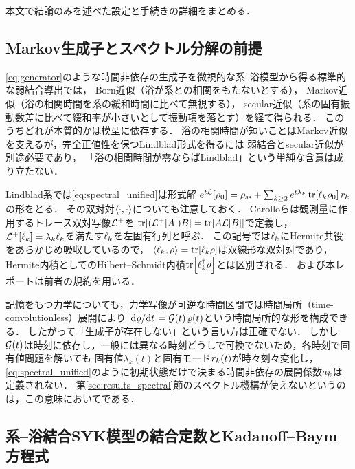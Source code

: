 \documentclass[a4paper,11pt,onecolumn,baselineskip=14.5pt]{jlreq}
\begin{document}
本文で結論のみを述べた設定と手続きの詳細をまとめる．

\subsection{Markov生成子とスペクトル分解の前提}
\label{sec:appendix_markov}

\eqref{eq:generator}のような時間非依存の生成子を微視的な系--浴模型から得る標準的な弱結合導出では，
Born近似（浴が系との相関をもたないとする），
Markov近似（浴の相関時間を系の緩和時間に比べて無視する），
secular近似（系の固有振動数差に比べて緩和率が小さいとして振動項を落とす）を経て得られる．
このうちどれが本質的かは模型に依存する．
浴の相関時間が短いことはMarkov近似を支えるが，完全正値性を保つLindblad形式を得るには
弱結合とsecular近似が別途必要であり，
「浴の相関時間が零ならばLindblad」という単純な含意は成り立たない．

Lindblad系では\eqref{eq:spectral_unified}は形式解
$e^{t\mathcal{L}}[\rho_0]=\rho_{\mathrm{ss}}+\sum_{k\ge2}e^{t\lambda_k}\tr[\ell_{k}\rho_0]\,r_{k}$
の形をとる\cite{Carollo2021}．
その双対対$\langle \cdot , \cdot \rangle$についても注意しておく．
Carolloらは観測量に作用するトレース双対写像$\mathcal{L}^{+}$を
$\tr[(\mathcal{L}^{+}[A])B]=\tr[A\mathcal{L}[B]]$で定義し，
$\mathcal{L}^{+}[\ell_{k}]=\lambda_k\ell_{k}$を満たす$\ell_{k}$を左固有行列と呼ぶ．
この記号では$\ell_{k}$にHermite共役をあらかじめ吸収しているので，
$\langle \ell_{k} , \rho \rangle=\tr[\ell_{k}\rho]$は双線形な双対対であり，
Hermite内積としてのHilbert--Schmidt内積$\tr[\ell_{k}^{\dagger}\rho]$とは区別される．
\cite{Carollo2021}および本レポートは前者の規約を用いる．

記憶をもつ力学についても，力学写像が可逆な時間区間では時間局所（time-convolutionless）展開により
$\dv*{\varrho}{t}=\mathcal{G}(t)\,\varrho(t)$という時間局所的な形を構成できる．
したがって「生成子が存在しない」という言い方は正確でない．
しかし$\mathcal{G}(t)$は時刻に依存し，一般には異なる時刻どうしで可換でないため，各時刻で固有値問題を解いても
固有値$\lambda_k(t)$と固有モード$r_{k}(t)$が時々刻々変化し，
\eqref{eq:spectral_unified}のように初期状態だけで決まる時間非依存の展開係数$a_{k}$は定義されない．
第\ref{sec:results_spectral}節のスペクトル機構が使えないというのは，この意味においてである．

\subsection{系--浴結合SYK模型の結合定数とKadanoff--Baym方程式}
\label{sec:appendix_syk_bath}
\end{document}

